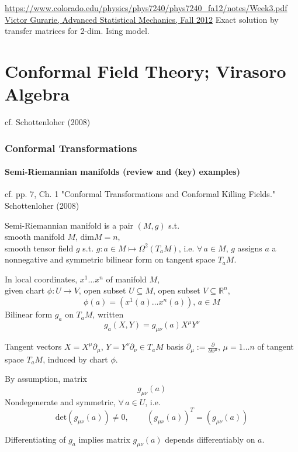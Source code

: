 \documentclass[10pt]{amsart}
\begin{document}
\begin{multicols*}{2}
\url{https://www.colorado.edu/physics/phys7240/phys7240_fa12/notes/Week3.pdf}
\href{https://www.colorado.edu/physics/phys7240/phys7240_fa12/notes/Week3.pdf}{Victor Gurarie, Advanced Statistical Mechanics, Fall 2012}
Exact solution by transfer matrices for 2-dim. Ising model.  


\part{Conformal Field Theory; Virasoro Algebra}  

cf. Schottenloher (2008)  \cite{Scho2008}

\section{Conformal Transformations}

\subsection{Semi-Riemannian manifolds (review and (key) examples)}

cf. pp. 7, Ch. 1 "Conformal Transformations and Conformal Killing Fields." Schottenloher (2008)  \cite{Scho2008}

Semi-Riemannian manifold is a pair $(M, g)$ s.t. \\
smooth manifold $M$, $\text{dim}{M} = n$, \\
smooth tensor field $g$ s.t. $g: a\in M \mapsto \Omega^2(T_aM)$, i.e. 
$\forall \, a \in M$, $g$ assigns $a$ a nonnegative and symmetric bilinear form on tangent space $T_aM$. 

In local coordinates, $x^1 \dots x^n $ of manifold $M$,  \\
given chart $\phi : U \to V$, open subset $U \subseteq M$, open subset $V \subseteq \mathbb{R}^n$, 
\[
\phi(a) = (x^1(a) \dots x^n(a)), \, a\in M
\]
Bilinear form $g_a$ on $T_aM$, written
\[
g_a(X,Y) = g_{\mu \nu}(a) X^{\mu} Y^{\nu}
\]

Tangent vectors $X = X^{\mu} \partial_{\mu}$, $Y = Y^{\nu} \partial_{\nu} \in T_aM$ basis $\partial_{\mu} := \frac{ \partial }{ \partial x^{\mu}}$, $\mu = 1 \dots n$ of tangent space $T_aM$, induced by chart $\phi$. 

By assumption, matrix
\[
g_{\mu \nu}(a)
\]
Nondegenerate and symmetric, $\forall \, a \in U$, i.e. 
\[
\text{det}(g_{\mu \nu }(a)) \neq 0 , \qquad \, (g_{\mu \nu}(a))^T = (g_{\mu \nu}(a))
\]

Differentiating of $g_a$ implies matrix $g_{\mu \nu}(a)$ depends differentiably on $a$.


\end{multicols*}
\end{document}
